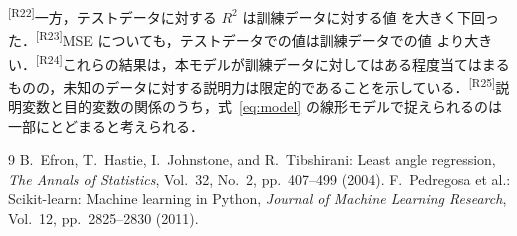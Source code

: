 \documentclass[9pt,a4paper,twocolumn]{ltjsarticle}
\newcommand{\sid}[1]{\textsuperscript{\textsf{\scriptsize[#1]}}}
\begin{document}
\sid{R22}一方，テストデータに対する $R^2$ は訓練データに対する値 \TrainRsq{} を大きく下回った．\sid{R23}MSE についても，テストデータでの値は訓練データでの値 \TrainMse{} より大きい．\sid{R24}これらの結果は，本モデルが訓練データに対してはある程度当てはまるものの，未知のデータに対する説明力は限定的であることを示している．\sid{R25}説明変数と目的変数の関係のうち，式~\eqref{eq:model} の線形モデルで捉えられるのは一部にとどまると考えられる．

\begin{thebibliography}{9}
\small
{} B.~Efron, T.~Hastie, I.~Johnstone, and R.~Tibshirani: Least angle regression, \textit{The Annals of Statistics}, Vol.~32, No.~2, pp.~407--499 (2004).
 F.~Pedregosa et al.: Scikit-learn: Machine learning in Python, \textit{Journal of Machine Learning Research}, Vol.~12, pp.~2825--2830 (2011).
\end{thebibliography}
\end{document}
